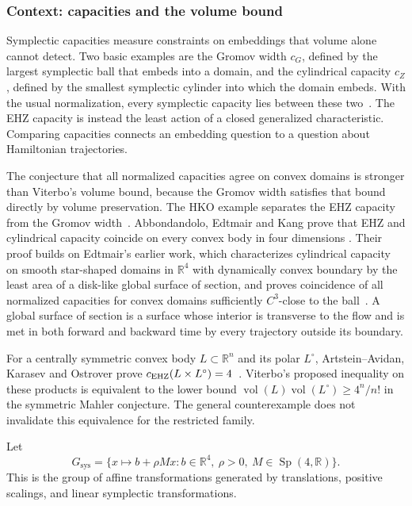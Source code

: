 \subsubsection*{Context: capacities and the volume bound}
\label{subsec:preliminaries-capacity-context}

Symplectic capacities measure constraints on embeddings that volume alone
cannot detect. Two basic examples are the Gromov width $c_G$, defined by
the largest symplectic ball that embeds into a domain, and the cylindrical
capacity $c_Z$, defined by the smallest symplectic cylinder into which the
domain embeds. With the usual normalization, every symplectic capacity lies
between these two~\cite{Edtmair2024}. The EHZ capacity is instead the least
action of a closed generalized characteristic. Comparing capacities
connects an embedding question to a question about Hamiltonian
trajectories.

The conjecture that all normalized capacities agree on convex domains is
stronger than Viterbo's volume bound, because the Gromov width satisfies
that bound directly by volume preservation. The HKO example separates the
EHZ capacity from the Gromov width~\cite{HaimKislevOstrover2024}.
Abbondandolo, Edtmair and Kang prove that EHZ and cylindrical capacity
coincide on every convex body in four dimensions
\cite[Corollary~1]{AbbondandoloEdtmairKang2024}. Their proof builds on
Edtmair's earlier work, which characterizes cylindrical capacity on smooth
star-shaped domains in $\mathbb R^4$ with dynamically convex boundary by the
least area of a disk-like global surface of section, and proves coincidence
of all normalized capacities for convex domains sufficiently $C^3$-close
to the ball~\cite{Edtmair2024}. A global surface of section is a surface
whose interior is transverse to the flow and is met in both forward and
backward time by every trajectory outside its boundary.

For a centrally symmetric convex body $L\subset\mathbb R^n$ and its polar
$L^\circ$, Artstein--Avidan, Karasev and Ostrover prove
$c_{\rm EHZ}(L\times L^\circ)=4$~\cite{AKO2014}. Viterbo's proposed
inequality on these products is equivalent to the lower bound
$\operatorname{vol}(L)\operatorname{vol}(L^\circ)\geq4^n/n!$ in the
symmetric Mahler conjecture. The general counterexample does not
invalidate this equivalence for the restricted family.

\begin{definition}
\label{def:preliminaries-systolic-ratio-symmetries}
Let
\[
  G_{\operatorname{sys}}
  =
  \{x\mapsto b+\rho Mx:
    b\in\mathbb R^4,\ \rho>0,\ M\in\operatorname{Sp}(4,\mathbb R)\}.
\]
This is the group of affine transformations generated by translations,
positive scalings, and linear symplectic transformations.
\end{definition}

